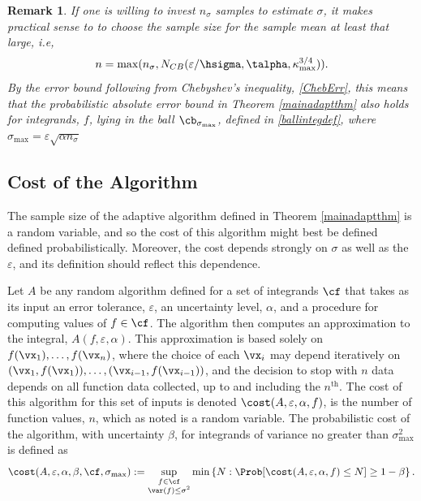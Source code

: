 \documentclass[graybox]{svmult}
\newtheorem{rem}{Remark}
\begin{document}
\begin{rem} If one is willing to invest $n_\sigma$ samples to estimate $\sigma$, it makes practical sense to to choose the sample size for the sample mean at least that large, i.e, 
\[
n = \max(n_{\sigma},N_{CB}(\varepsilon/\hsigma,\talpha,\kappa_{\max}^{3/4})).
\]
By the error bound following from Chebyshev's inequality, \eqref{ChebErr}, this means that the probabilistic absolute error bound in Theorem \ref{mainadaptthm} also holds for integrands, $f$, lying in the ball $\cb_{\sigma_{\max}}$, defined in \eqref{ballintegdef}, where $\sigma_{\max} = \varepsilon \sqrt{\alpha n_{\sigma}}$ 
\end{rem}


\subsection{Cost of the Algorithm}  The sample size of the adaptive algorithm defined in Theorem \ref{mainadaptthm} is a random variable, and so the cost of this algorithm might best be defined defined probabilistically.  Moreover, the cost depends strongly on $\sigma$ as well as the $\varepsilon$, and its definition should reflect this dependence. 

Let $A$ be any random algorithm defined for a set of integrands $\cf$ that takes as its input an error tolerance, $\varepsilon$, an uncertainty level, $\alpha$, and a  procedure for computing values of $f \in \cf$.  The algorithm then computes an approximation to the integral, $A(f,\varepsilon,\alpha)$.  This approximation is based solely on  $f(\vx_1), \ldots, f(\vx_n)$, where the choice of each $\vx_i$ may depend iteratively on $(\vx_1,f(\vx_1)), \ldots, (\vx_{i-1},f(\vx_{i-1}))$, and the decision to stop with $n$ data depends on all function data collected, up to and including the $n^{\text{th}}$.  The cost of this algorithm for this set of inputs is denoted $\cost(A,\varepsilon,\alpha,f)$, is the number of function values, $n$, which as noted is a random variable.  The probabilistic cost of the algorithm, with uncertainty $\beta$, for integrands of variance no greater than $\sigma^2_{\max}$ is defined as 
\begin{equation}
\cost(A,\varepsilon,\alpha,\beta,\cf,\sigma_{\max}) := \sup_{\substack{f \in \cf\\ \var(f)\le \sigma^2} } \min\left\{N : \Prob[\cost(A,\varepsilon,\alpha,f) \le N] \ge 1-\beta  \right \}.
\end{equation}
\end{document}
